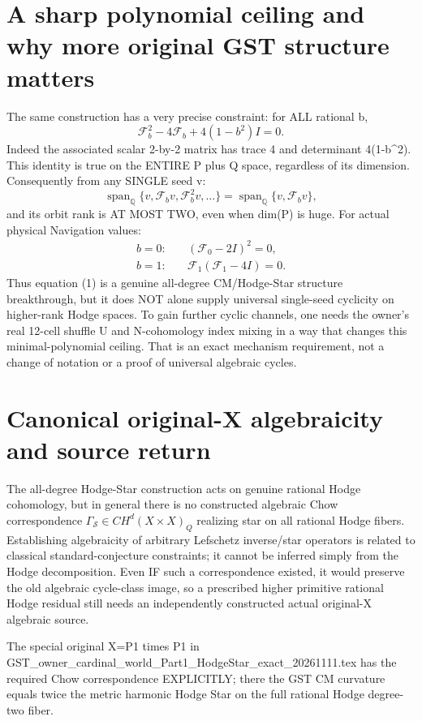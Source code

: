 \documentclass[11pt]{article}
\begin{document}
\section{A sharp polynomial ceiling and why more original GST structure matters}
The same construction has a very precise
constraint: for ALL rational b,
\[
\boxed{
\mathscr F_b^2-4\mathscr F_b+
 4(1-b^2)I=0.
}\tag{3}
\]
Indeed the associated scalar 2-by-2 matrix
has trace 4 and determinant 4(1-b^2).
This identity is true on the ENTIRE
P plus Q space, regardless of its dimension.
Consequently from any SINGLE seed v:
\[
\operatorname{span}_{\mathbb Q}
\{v,\mathscr F_bv,\mathscr F_b^2v,\ldots\}
=\operatorname{span}_{\mathbb Q}
\{v,\mathscr F_bv\},
\]
and its orbit rank is AT MOST TWO,
even when dim(P) is huge.
For actual physical Navigation values:
\[
\begin{aligned}
b=0:&\quad (\mathscr F_0-2I)^2=0,\\
b=1:&\quad \mathscr F_1(\mathscr F_1-4I)=0.
\end{aligned}
\]
Thus equation (1) is a genuine all-degree
CM/Hodge-Star structure breakthrough, but
it does NOT alone supply universal single-seed
cyclicity on higher-rank Hodge spaces.
To gain further cyclic channels, one needs
the owner's real 12-cell shuffle U and
N-cohomology index mixing in a way that
changes this minimal-polynomial ceiling.
That is an exact mechanism requirement,
not a change of notation or a proof of
universal algebraic cycles.

\section{Canonical original-X algebraicity and source return}
The all-degree Hodge-Star construction acts
on genuine rational Hodge cohomology, but
in general there is no constructed
algebraic Chow correspondence
\(\Gamma_{\mathscr S}\in CH^d(X\times X)_Q\)
realizing star on all rational Hodge fibers.
Establishing algebraicity of arbitrary
Lefschetz inverse/star operators is related
to classical standard-conjecture constraints;
it cannot be inferred simply from the
Hodge decomposition. Even IF such a
correspondence existed, it would preserve
the old algebraic cycle-class image,
so a prescribed higher primitive rational
Hodge residual still needs an independently
constructed actual original-X algebraic source.

The special original X=P1 times P1 in
GST_owner_cardinal_world_Part1_HodgeStar_exact_20261111.tex
has the required Chow correspondence EXPLICITLY;
there the GST CM curvature equals twice
the metric harmonic Hodge Star on the
full rational Hodge degree-two fiber.
\end{document}
